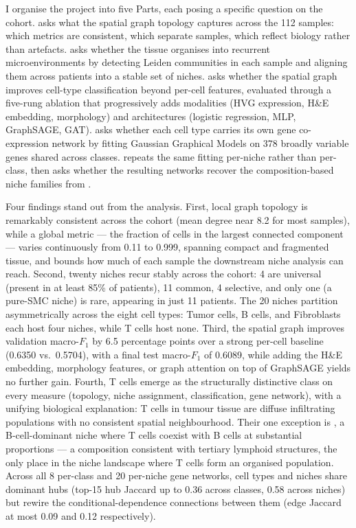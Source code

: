 I organise the project into five Parts, each posing a specific question on the cohort.  asks what the spatial graph topology captures across the 112 samples: which metrics are consistent, which separate samples, which reflect biology rather than artefacts.  asks whether the tissue organises into recurrent microenvironments by detecting Leiden communities in each sample and aligning them across patients into a stable set of niches.  asks whether the spatial graph improves cell-type classification beyond per-cell features, evaluated through a five-rung ablation that progressively adds modalities (HVG expression, H\&E embedding, morphology) and architectures (logistic regression, MLP, GraphSAGE, GAT).  asks whether each cell type carries its own gene co-expression network by fitting Gaussian Graphical Models on 378 broadly variable genes shared across classes.  repeats the same fitting per-niche rather than per-class, then asks whether the resulting networks recover the composition-based niche families from .

Four findings stand out from the analysis. First, local graph topology is remarkably consistent across the cohort (mean degree near 8.2 for most samples), while a global metric --- the fraction of cells in the largest connected component --- varies continuously from 0.11 to 0.999, spanning compact and fragmented tissue, and bounds how much of each sample the downstream niche analysis can reach. Second, twenty niches recur stably across the cohort: 4 are universal (present in at least 85\% of patients), 11 common, 4 selective, and only one (a pure-SMC niche) is rare, appearing in just 11 patients. The 20 niches partition asymmetrically across the eight cell types: Tumor cells, B cells, and Fibroblasts each host four niches, while T cells host none. Third, the spatial graph improves validation macro-$F_1$ by 6.5 percentage points over a strong per-cell baseline (0.6350 vs.\ 0.5704), with a final test macro-$F_1$ of 0.6089, while adding the H\&E embedding, morphology features, or graph attention on top of GraphSAGE yields no further gain. Fourth, T cells emerge as the structurally distinctive class on every measure (topology, niche assignment, classification, gene network), with a unifying biological explanation: T cells in tumour tissue are diffuse infiltrating populations with no consistent spatial neighbourhood. Their one exception is , a B-cell-dominant niche where T cells coexist with B cells at substantial proportions --- a composition consistent with tertiary lymphoid structures, the only place in the niche landscape where T cells form an organised population. Across all 8 per-class and 20 per-niche gene networks, cell types and niches share dominant hubs (top-15 hub Jaccard up to 0.36 across classes, 0.58 across niches) but rewire the conditional-dependence connections between them (edge Jaccard at most 0.09 and 0.12 respectively).


